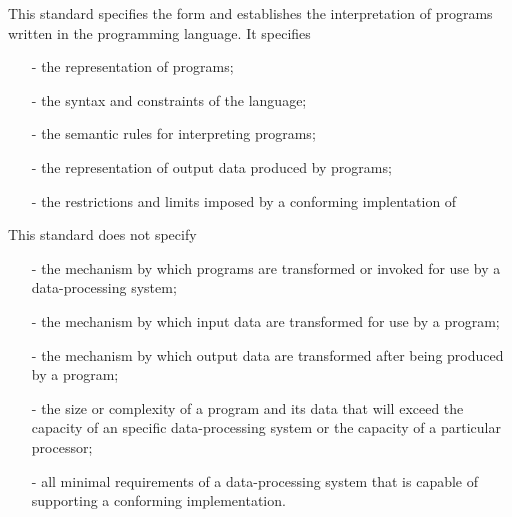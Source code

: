 This standard specifies the form and establishes the interpretation of programs written in the \lP programming language.
It specifies
\begin{itemize}
\item[-] the representation of \lP programs;
\item[-] the syntax and constraints of the \lP language;
\item[-] the semantic rules for interpreting \lP programs;
\item[-] the representation of output data produced by \lP programs;
\item[-] the restrictions and limits imposed by a conforming implentation of \lP
\end{itemize}

This standard does not specify
\begin{itemize}
\item[-] the mechanism by which \lP programs are transformed or invoked for use by a data-processing system;
\item[-] the mechanism by which input data are transformed for use by a \lP program;
\item[-] the mechanism by which output data are transformed after being produced by a \lP program;
\item[-] the size or complexity of a program and its data that will exceed the capacity of an specific data-processing system or the capacity of a particular processor;
\item[-] all minimal requirements of a data-processing system that is capable of supporting a conforming implementation.
\end{itemize}
